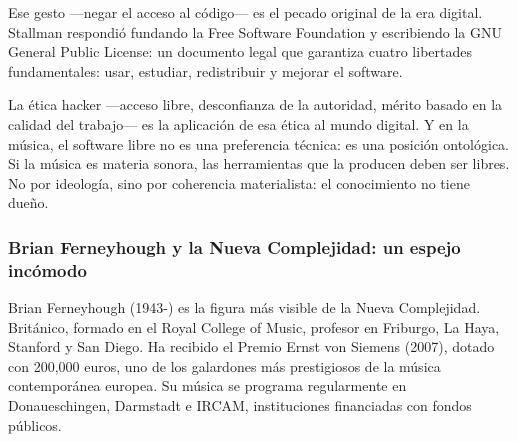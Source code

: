 \documentclass[14pt, a4paper]{article}
\begin{document}
Ese gesto —negar el acceso al código— es el pecado original de la era
digital. Stallman respondió fundando la Free Software Foundation y
escribiendo la GNU General Public License: un documento legal que
garantiza cuatro libertades fundamentales: usar, estudiar, redistribuir
y mejorar el software.

La ética hacker —acceso libre, desconfianza de la autoridad, mérito
basado en la calidad del trabajo— es la aplicación de esa ética al
mundo digital. Y en la música, el software libre no es una preferencia
técnica: es una posición ontológica. Si la música es materia sonora,
las herramientas que la producen deben ser libres. No por ideología,
sino por coherencia materialista: el conocimiento no tiene dueño.
\subsubsection{Brian Ferneyhough y la Nueva Complejidad: un espejo incómodo}
\label{ferneyhough}
Brian Ferneyhough (1943-) es la figura más visible de la Nueva
Complejidad. Británico, formado en el Royal College of Music, profesor
en Friburgo, La Haya, Stanford y San Diego. Ha recibido el Premio
Ernst von Siemens (2007), dotado con 200,000 euros, uno de los
galardones más prestigiosos de la música contemporánea europea. Su
música se programa regularmente en Donaueschingen, Darmstadt e IRCAM,
instituciones financiadas con fondos públicos.
\end{document}

